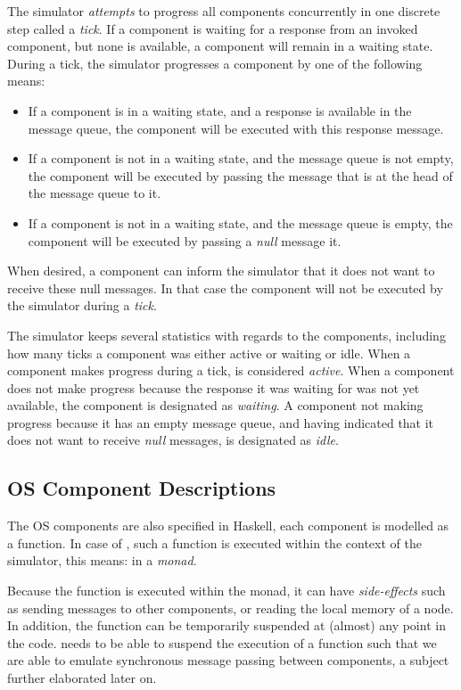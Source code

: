 The simulator \emph{attempts} to progress all components concurrently in one discrete step called a \emph{tick}.
If a component is waiting for a response from an invoked component, but none is available, a component will remain in a waiting state.
During a tick, the simulator progresses a component by one of the following means:
\begin{itemize}
  \item If a component is in a waiting state, and a response is available in the message queue, the component will be executed with this response message.
  \item If a component is not in a waiting state, and the message queue is not empty, the component will be executed by passing the message that is at the head of the message queue to it.
  \item If a component is not in a waiting state, and the message queue is empty, the component will be executed by passing a \emph{null} message it.
\end{itemize}
When desired, a component can inform the simulator that it does not want to receive these null messages.
In that case the component will not be executed by the simulator during a \emph{tick}.

The simulator keeps several statistics with regards to the components, including how many ticks a component was either active or waiting or idle.
When a component makes progress during a tick, is considered \emph{active}.
When a component does not make progress because the response it was waiting for was not yet available, the component is designated as \emph{waiting}.
A component not making progress because it has an empty message queue, and having indicated that it does not want to receive \emph{null} messages, is designated as \emph{idle}.

\subsection{OS Component Descriptions}
The OS components are also specified in Haskell, each component is modelled as a function.
In case of \soosim, such a function is executed within the context of the simulator, this means: in a \emph{monad}.

Because the function is executed within the monad, it can have \emph{side-effects} such as sending messages to other components, or reading the local memory of a node.
In addition, the function can be temporarily suspended at (almost) any point in the code.
\soosim needs to be able to suspend the execution of a function such that we are able to emulate synchronous message passing between components, a subject further elaborated later on.

